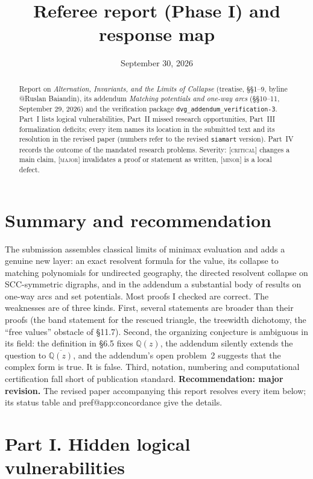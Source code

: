 \documentclass[11pt]{amsart}
\title{Referee report (Phase I) and response map}
\date{September 30, 2026}
\makeatletter
\newcommand{\pref}[1]{\csname pref@#1\endcsname}
\newcommand{\Qz}{\mathbb{Q}(z)}
\newcommand{\Qzbar}{\overline{\mathbb{Q}(z)}}
\newcommand{\sev}[1]{\textsc{[#1]}}
\makeatother
\begin{document}
\begin{abstract}
Report on \emph{Alternation, Invariants, and the Limits of Collapse} (treatise, \S\S1--9, byline @Ruslan Baiandin), its addendum \emph{Matching potentials and one-way arcs} (\S\S10--11, September 29, 2026) and the verification package \texttt{dvg\_addendum\_verification-3}. Part~I lists logical vulnerabilities, Part~II missed research opportunities, Part~III formalization deficits; every item names its location in the submitted text and its resolution in the revised paper (numbers refer to the revised \texttt{siamart} version). Part~IV records the outcome of the mandated research problems. Severity: \sev{critical} changes a main claim, \sev{major} invalidates a proof or statement as written, \sev{minor} is a local defect.
\end{abstract}
\maketitle

\section*{Summary and recommendation}

The submission assembles classical limits of minimax evaluation and adds a genuine new layer: an exact resolvent formula for the value, its collapse to matching polynomials for undirected geography, the directed resolvent collapse on SCC-symmetric digraphs, and in the addendum a substantial body of results on one-way arcs and set potentials. Most proofs I checked are correct. The weaknesses are of three kinds. First, several statements are broader than their proofs (the band statement for the rescued triangle, the treewidth dichotomy, the ``free values'' obstacle of \S11.7). Second, the organizing conjecture is ambiguous in its field: the definition in \S6.5 fixes $\Qz$, the addendum silently extends the question to $\Qzbar$, and the addendum's open problem~2 suggests that the complex form is true. It is false. Third, notation, numbering and computational certification fall short of publication standard. \textbf{Recommendation: major revision.} The revised paper accompanying this report resolves every item below; its status table and \pref{app:concordance} give the details.

\section*{Part I. Hidden logical vulnerabilities}
\end{document}
